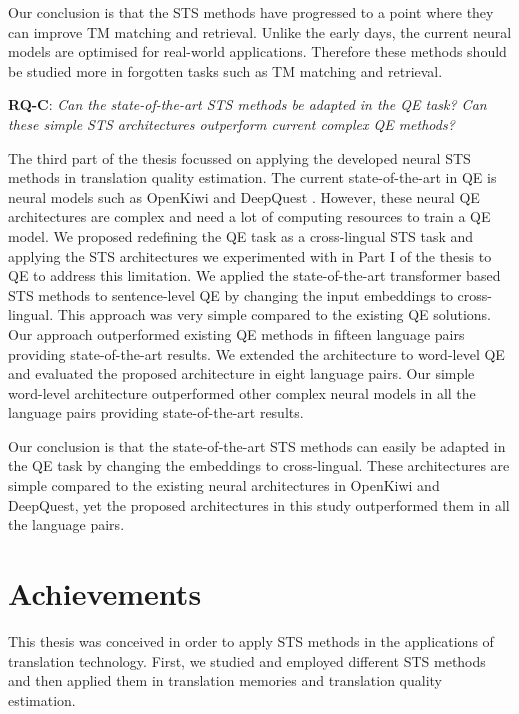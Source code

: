 Our conclusion is that the STS methods have progressed to a point where they can improve TM matching and retrieval. Unlike the early days, the current neural models are optimised for real-world applications. Therefore these methods should be studied more in forgotten tasks such as TM matching and retrieval.

\textbf{RQ-C}: \textit{Can the state-of-the-art STS methods be adapted in the QE task? Can these simple STS architectures outperform current complex QE methods?}

The third part of the thesis focussed on applying the developed neural STS methods in translation quality estimation. The current state-of-the-art in QE is neural models such as OpenKiwi \autocite{kepler-etal-2019-openkiwi} and DeepQuest \autocite{ive-etal-2018-deepquest}. However, these neural QE architectures are complex and need a lot of computing resources to train a QE model. We proposed redefining the QE task as a cross-lingual STS task and applying the STS architectures we experimented with in Part I of the thesis to QE to address this limitation. We applied the state-of-the-art transformer based STS methods to sentence-level QE by changing the input embeddings to cross-lingual. This approach was very simple compared to the existing QE solutions. Our approach outperformed existing QE methods in fifteen language pairs providing state-of-the-art results. We extended the architecture to word-level QE and evaluated the proposed architecture in eight language pairs. Our simple word-level architecture outperformed other complex neural models in all the language pairs providing state-of-the-art results. 

Our conclusion is that the state-of-the-art STS methods can easily be adapted in the QE task by changing the embeddings to cross-lingual. These architectures are simple compared to the existing neural architectures in OpenKiwi and DeepQuest, yet the proposed architectures in this study outperformed them in all the language pairs. 

\section{Achievements}
\label{sec:achievements}
This thesis was conceived in order to apply STS methods in the applications of translation technology. First, we studied and employed different STS methods and then applied them in translation memories and translation quality estimation.

